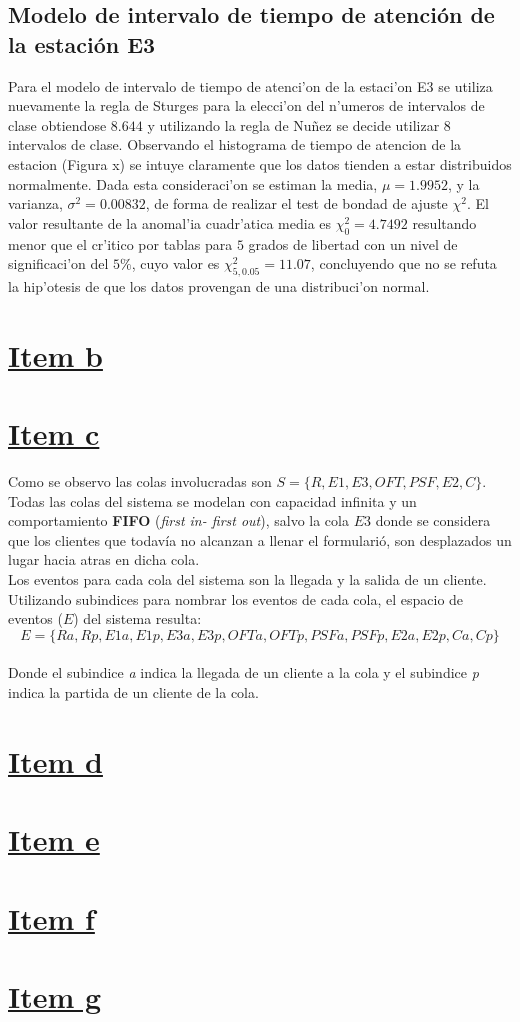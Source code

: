 \documentclass[a4paper,10pt]{article}
\begin{document}
\subsection{Modelo de intervalo de tiempo de atención de la estación E3}
Para el modelo de intervalo de tiempo de atenci'on de la estaci'on E3 se utiliza nuevamente la regla de Sturges para la elecci'on del n'umeros de intervalos de clase obtiendose $8.644$ y utilizando la regla de Nuñez se decide utilizar $8$ intervalos de clase. 
Observando el histograma de tiempo de atencion de la estacion (Figura x) se intuye claramente que los datos tienden a estar distribuidos normalmente. Dada esta consideraci'on se estiman la media, $\mu = 1.9952 $, y la varianza, $\sigma^2 = 0.00832$, de forma de realizar el test de bondad de ajuste $\chi^2$. El valor resultante de la anomal'ia cuadr'atica media es $\chi_0^2 = 4.7492$ resultando menor que el cr'itico por tablas para $5$ grados de libertad con un nivel de significaci'on del $5\%$, cuyo valor es $\chi_{5,0.05}^2 = 11.07$, concluyendo que no se refuta la hip'otesis de que los datos provengan de una distribuci'on normal.

\section*{\underline{Item b}}
\section*{\underline{Item c}}
Como se observo las colas involucradas son $S = \{R, E1, E3, OFT, PSF, E2, C\}$.\\
Todas las colas del sistema se modelan con capacidad infinita y un comportamiento \textbf{FIFO} (\textit{first in- first out}), salvo la cola $E3$ 
donde se considera que los clientes que todav\'ia no alcanzan a llenar el formulari\'o, son desplazados un lugar hacia atras en dicha cola.\\
Los eventos para cada cola del sistema son la llegada y la salida de un cliente.
Utilizando subindices para nombrar los eventos de cada cola, el espacio de eventos ($E$) del sistema resulta:\\
$$E = \{Ra , Rp , E1a , E1p , E3a , E3p , OFTa , OFTp , PSFa , PSFp , E2a , E2p , Ca , Cp \}$$\\
Donde el subindice \textit{a} indica la llegada de un cliente a la cola y el subindice \textit{p} indica la partida de un cliente de la cola.

\section*{\underline{Item d}}
\section*{\underline{Item e}}
\section*{\underline{Item f}}
\section*{\underline{Item g}}
\end{document}
